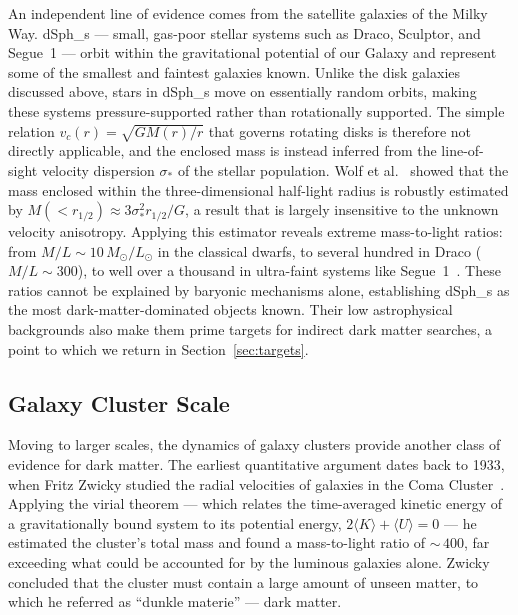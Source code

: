 An independent line of evidence comes from the satellite galaxies of the Milky Way.
\Glspl{dSph_} --- small, gas-poor stellar systems such as Draco, Sculptor, and Segue~1 --- orbit within the gravitational potential of our Galaxy and represent some of the smallest and faintest galaxies known.
Unlike the disk galaxies discussed above, stars in \glspl{dSph_} move on essentially random orbits, making these systems pressure-supported rather than rotationally supported.
The simple relation $v_c(r) = \sqrt{GM(r)/r}$ that governs rotating disks is therefore not directly applicable, and the enclosed mass is instead inferred from the line-of-sight velocity dispersion $\sigma_*$ of the stellar population.
Wolf et al.~\cite{Wolf:2009tu} showed that the mass enclosed within the three-dimensional half-light radius is robustly estimated by $M(<r_{1/2}) \approx 3\sigma_*^2 r_{1/2} / G$, a result that is largely insensitive to the unknown velocity anisotropy.
Applying this estimator reveals extreme mass-to-light ratios: from $M/L \sim 10\,M_\odot/L_\odot$ in the classical dwarfs, to several hundred in Draco ($M/L \sim 300$), to well over a thousand in ultra-faint systems like Segue~1~\cite{Walker:2009zp,Wolf:2009tu}.
These ratios cannot be explained by baryonic mechanisms alone, establishing \glspl{dSph_} as the most dark-matter-dominated objects known.
Their low astrophysical backgrounds also make them prime targets for indirect dark matter searches, a point to which we return in Section~\ref{sec:targets}.

\subsection{Galaxy Cluster Scale}
\label{sec:1.1.2}

Moving to larger scales, the dynamics of galaxy clusters provide another class of evidence for dark matter.
The earliest quantitative argument dates back to 1933, when Fritz Zwicky studied the radial velocities of galaxies in the Coma Cluster~\cite{Zwicky:1933}.
Applying the virial theorem --- which relates the time-averaged kinetic energy of a gravitationally bound system to its potential energy, $2\langle K \rangle + \langle U \rangle = 0$ --- he estimated the cluster's total mass and found a mass-to-light ratio of ${\sim}\,400$, far exceeding what could be accounted for by the luminous galaxies alone.
Zwicky concluded that the cluster must contain a large amount of unseen matter, to which he referred as ``dunkle materie'' --- dark matter.

